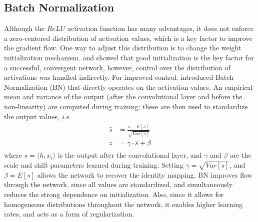 \documentclass[final,3p,times,twocolumn,authoryear]{elsarticle}
\newcommand{\ie}{\textit{i}.\textit{e}.}
\begin{document}
\subsection{Batch Normalization}
\label{sec:batch_normalization}
Although the $ReLU$ activation function has many advantages, it does not enforce a zero-centered distribution of activation values, which is a key factor to improve the gradient flow. 
One way to adjust this distribution is to change the weight initialization mechanism.  
 and \citet{He_Normal} showed that good initialization is the key factor for a successful, convergent network, however, control over the distribution of activations was handled indirectly.
For improved control, \citet{BatchNorm} introduced Batch Normalization (BN) that directly operates on the activation values. 
An empirical mean and variance of the output (after the convolutional layer and before the non-linearity) are computed during training; these are then used to standardize the output values,  \ie 
\begin{align}
\label{eq:batchnorm}
\begin{split}
\hat{s} &= \frac{{s} -E[s]}{ \sqrt{Var[s]} }
\\
 z &= \gamma\cdot\hat{s}+\beta
\end{split}
\end{align}
where $s=\langle h{,}x_{i}\rangle$ is the output after the convolutional layer, and $\gamma$ and $\beta$ are the scale and shift parameters learned during training. 
Setting $\gamma= \sqrt{Var[s]}$, and $\beta=E[s]$ allows the network to recover the identity mapping.
BN improves flow through the network, since all values are standardized, and simultaneously reduces the strong dependence on initialization. 
Also, since it allows for homogeneous distributions throughout the network, it enables higher learning rates, and acts as a form of regularization. 
\end{document}
